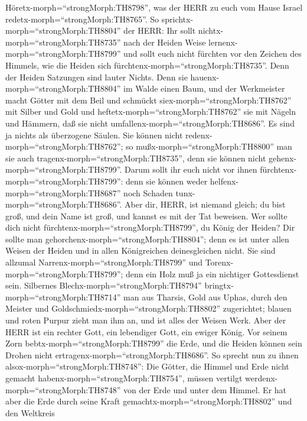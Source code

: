  Höretx-morph=``strongMorph:TH8798'', was der HERR zu euch
vom Hause Israel redetx-morph=``strongMorph:TH8765''.  So
sprichtx-morph=``strongMorph:TH8804'' der HERR: Ihr sollt
nichtx-morph=``strongMorph:TH8735'' nach der Heiden Weise
lernenx-morph=``strongMorph:TH8799'' und sollt euch nicht fürchten vor
den Zeichen des Himmels, wie die Heiden sich
fürchtenx-morph=``strongMorph:TH8735''.  Denn der Heiden
Satzungen sind lauter Nichts. Denn sie
hauenx-morph=``strongMorph:TH8804'' im Walde einen Baum, und der
Werkmeister macht Götter mit dem Beil  und schmückt
siex-morph=``strongMorph:TH8762'' mit Silber und Gold und
heftetx-morph=``strongMorph:TH8762'' sie mit Nägeln und Hämmern, daß sie
nicht umfallenx-morph=``strongMorph:TH8686''.  Es sind ja
nichts als überzogene Säulen. Sie können nicht
redenx-morph=``strongMorph:TH8762''; so
mußx-morph=``strongMorph:TH8800'' man sie auch
tragenx-morph=``strongMorph:TH8735'', denn sie können nicht
gehenx-morph=``strongMorph:TH8799''. Darum sollt ihr euch nicht vor
ihnen fürchtenx-morph=``strongMorph:TH8799'': denn sie können weder
helfenx-morph=``strongMorph:TH8687'' noch Schaden
tunx-morph=``strongMorph:TH8686''.  Aber dir, HERR, ist
niemand gleich; du bist groß, und dein Name ist groß, und kannst es mit
der Tat beweisen.  Wer sollte dich nicht
fürchtenx-morph=``strongMorph:TH8799'', du König der Heiden? Dir sollte
man gehorchenx-morph=``strongMorph:TH8804''; denn es ist unter allen
Weisen der Heiden und in allen Königreichen deinesgleichen nicht.
 Sie sind allzumal Narrenx-morph=``strongMorph:TH8799'' und
Torenx-morph=``strongMorph:TH8799''; denn ein Holz muß ja ein nichtiger
Gottesdienst sein.  Silbernes
Blechx-morph=``strongMorph:TH8794'' bringtx-morph=``strongMorph:TH8714''
man aus Tharsis, Gold aus Uphas, durch den Meister und
Goldschmiedx-morph=``strongMorph:TH8802'' zugerichtet; blauen und roten
Purpur zieht man ihm an, und ist alles der Weisen Werk. 
Aber der HERR ist ein rechter Gott, ein lebendiger Gott, ein ewiger
König. Vor seinem Zorn bebtx-morph=``strongMorph:TH8799'' die Erde, und
die Heiden können sein Drohen nicht
ertragenx-morph=``strongMorph:TH8686''.  So sprecht nun zu
ihnen alsox-morph=``strongMorph:TH8748'': Die Götter, die Himmel und
Erde nicht gemacht habenx-morph=``strongMorph:TH8754'', müssen vertilgt
werdenx-morph=``strongMorph:TH8748'' von der Erde und unter dem Himmel.
 Er hat aber die Erde durch seine Kraft
gemachtx-morph=``strongMorph:TH8802'' und den Weltkreis
